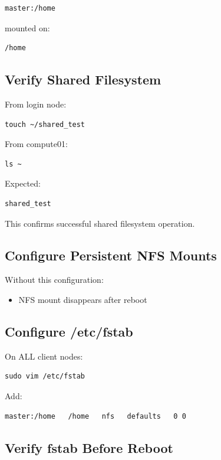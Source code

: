 \documentclass[11pt]{article}
\begin{document}
\begin{verbatim}
master:/home
\end{verbatim}

mounted on:

\begin{verbatim}
/home
\end{verbatim}
\subsection{Verify Shared Filesystem}
\label{sec:org5e7a84e}

From login node:

\begin{verbatim}
touch ~/shared_test
\end{verbatim}

From compute01:

\begin{verbatim}
ls ~
\end{verbatim}

Expected:

\begin{verbatim}
shared_test
\end{verbatim}

This confirms successful shared filesystem operation.
\subsection{Configure Persistent NFS Mounts}
\label{sec:org21e3621}

Without this configuration:

\begin{itemize}
\item NFS mount disappears after reboot
\end{itemize}
\subsection{Configure /etc/fstab}
\label{sec:orgdf5c609}

On ALL client nodes:

\begin{verbatim}
sudo vim /etc/fstab
\end{verbatim}

Add:

\begin{verbatim}
master:/home   /home   nfs   defaults   0 0
\end{verbatim}
\subsection{Verify fstab Before Reboot}
\label{sec:orgc2249b7}
\end{document}
